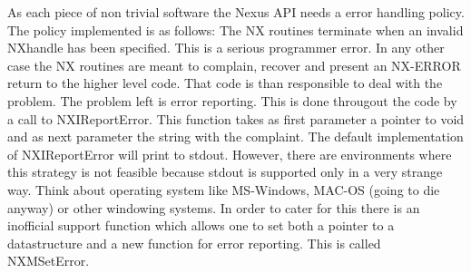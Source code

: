 \documentclass[12pt]{article}
\begin{document}
As each piece of non trivial software the Nexus API needs a error handling
policy. The policy implemented is as follows: The NX routines terminate when
an invalid NXhandle has been specified. This is a serious programmer error.
In any other case the NX routines are meant to complain, recover and present
an NX-ERROR return to the higher level code. That code is than responsible
to deal with the problem. The problem left is error reporting. This is done
througout the code by a call to NXIReportError. This function takes as first
parameter a pointer to void and as next parameter the string with the
complaint. The default implementation of NXIReportError will print to
stdout. However, there are environments where this strategy is not feasible
because stdout is supported only in a very  strange way. Think about
operating system like MS-Windows, MAC-OS (going to die anyway) or other
windowing systems. In order to cater for this there is an inofficial support
function which allows one to set both a pointer to a datastructure and a new
function for error reporting. This is called NXMSetError.
\end{document}
